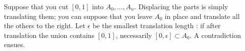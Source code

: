 \documentclass[12pt]{article}
\begin{document}
Suppose that you cut $[0,1]$ into $A_0,...,A_n$.
Displacing the parts is simply translating them; you can suppose
that you leave $A_0$ in place and translate all the others to the
right. Let $\epsilon$ be the smallest translation length : if after
translation the union contains $[0,1]$, necessarily $[0,\epsilon]
\subset A_0$. A contradiction ensues.
\end{document}
